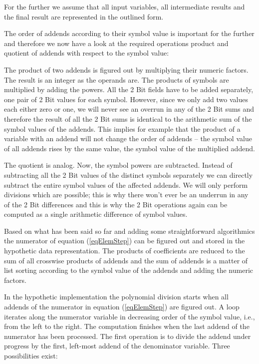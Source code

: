 For the further we assume that all input variables, all intermediate
results and the final result are represented in the outlined form.

The order of addends according to their symbol value is important for the
further and therefore we now have a look at the required operations product
and quotient of addends with respect to the symbol value:

The product of two addends is figured out by multiplying their numeric
factors. The result is an integer as the operands are. The products of
symbols are multiplied by adding the powers. All the 2 Bit fields have to
be added separately, one pair of 2 Bit values for each symbol. However,
since we only add two values each either zero or one, we will never see an
overrun in any of the 2 Bit sums and therefore the result of all the 2 Bit
sums is identical to the arithmetic sum of the symbol values of the
addends. This implies for example that the product of a variable with an
addend will not change the order of addends -- the symbol value of all
addends rises by the same value, the symbol value of the multiplied
addend.

The quotient is analog. Now, the symbol powers are subtracted. Instead of
subtracting all the 2 Bit values of the distinct symbols separately we can
directly subtract the entire symbol values of the affected addends. We
will only perform divisions which are possible; this is why there won't
ever be an underrun in any of the 2 Bit differences and this is why the 2
Bit operations again can be computed as a single arithmetic difference of
symbol values.

Based on what has been said so far and adding some straightforward
algorithmics the numerator of equation (\ref{eqElemStep}) can be figured
out and stored in the hypothetic data representation. The products of
coefficients are reduced to the sum of all crosswise products of addends
and the sum of addends is a matter of list sorting according to the symbol
value of the addends and adding the numeric factors.

In the hypothetic implementation the polynomial division starts when all
addends of the numerator in equation (\ref{eqElemStep}) are figured out. A
loop iterates along the numerator variable in decreasing order of the
symbol value, i.e., from the left to the right. The computation finishes
when the last addend of the numerator has been processed. The first
operation is to divide the addend under progress by the first, left-most
addend of the denominator variable. Three possibilities exist:

